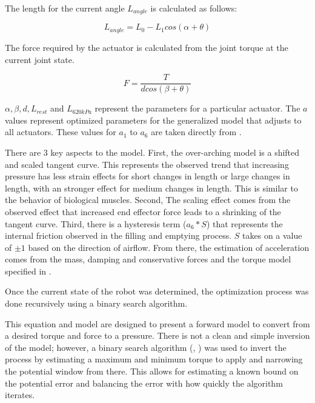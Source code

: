 The length for the current angle $L_{angle}$ is calculated as follows:

\begin{equation}
L_{angle} = L_{0} - L_{1} cos \left(\alpha + \theta \right)
\end{equation}

The force required by the actuator is calculated from the joint torque at the current joint state.

\begin{equation}
F = \dfrac{T}{d cos \left(\beta + \theta \right)}
\end{equation}

$\alpha, \beta, d, L_{rest}$ and $L_{620 kPa}$ represent the parameters for a 
particular actuator. The $a$ values represent optimized parameters
for the generalized model that adjusts to all actuators. These values for $a_{1}$ to $a_{6}$ are taken directly from \cite{HuntPMuscles}.

There are 3 key aspects to the model. First, the over-arching model is a shifted and 
scaled tangent curve. This represents the observed trend that increasing 
pressure has less strain effects for short changes in length or large changes in 
length, with an stronger effect for medium changes in length. This is similar to 
the behavior of biological muscles. Second, The scaling effect comes from the observed
effect that increased end effector force leads to a shrinking of the tangent 
curve. Third, there is a hysteresis term ($a_{6} * S$) that represents the internal
friction observed in the filling and emptying process. $S$ takes on a value of $\pm 1$ based on the direction of airflow.
From there, the estimation of acceleration comes from the mass, 
damping and conservative forces and the torque model specified in
.


Once the current state of the robot was determined, the optimization process was 
done recursively using a binary search algorithm. 

This equation and model are designed to present a forward model to convert from 
a desired torque and force to a pressure. There is not a clean and simple 
inversion of the model; however, a binary search algorithm 
(, ) was used to invert 
the process by estimating a maximum and minimum torque to apply and narrowing 
the
potential window from there. This allows for estimating a known bound on the 
potential error and balancing the error with how quickly the algorithm iterates.

